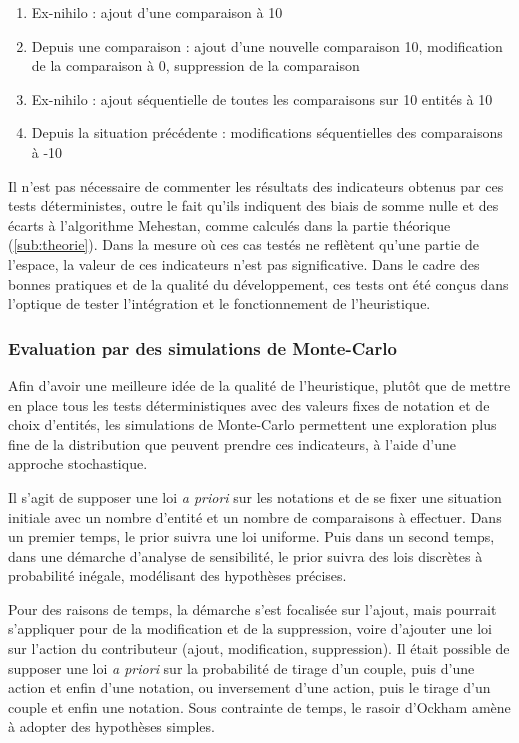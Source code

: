 \begin{enumerate}
    \item Ex-nihilo : ajout d'une comparaison à 10
    \item Depuis une comparaison : ajout d'une nouvelle comparaison 10, modification de la comparaison à 0, suppression de la comparaison
    \item Ex-nihilo : ajout séquentielle de toutes les comparaisons sur 10 entités à 10
    \item Depuis la situation précédente : modifications séquentielles des comparaisons à -10
\end{enumerate}

Il n'est pas nécessaire de commenter les résultats des indicateurs obtenus par ces tests déterministes, outre le fait qu'ils indiquent des biais de somme nulle et des écarts à l'algorithme Mehestan, comme calculés dans la partie théorique (\ref{sub:theorie}). Dans la mesure où ces cas testés ne reflètent qu'une partie de l'espace, la valeur de ces indicateurs n'est pas significative. Dans le cadre des bonnes pratiques et de la qualité du développement, ces tests ont été conçus dans l'optique de tester l'intégration et le fonctionnement de l'heuristique.


\subsubsection{Evaluation par des simulations de Monte-Carlo}

Afin d'avoir une meilleure idée de la qualité de l'heuristique, plutôt que de mettre en place tous les tests déterministiques avec des valeurs fixes de notation et de choix d'entités, les simulations de Monte-Carlo permettent une exploration plus fine de la distribution que peuvent prendre ces indicateurs, à l'aide d'une approche stochastique.

Il s'agit de supposer une loi \textit{a priori} sur les notations et de se fixer une situation initiale avec un nombre d'entité et un nombre de comparaisons à effectuer. Dans un premier temps, le prior suivra une loi uniforme. Puis dans un second temps, dans une démarche d'analyse de sensibilité, le prior suivra des lois discrètes à probabilité inégale, modélisant des hypothèses précises.

Pour des raisons de temps, la démarche s'est focalisée sur l'ajout, mais pourrait s'appliquer pour de la modification et de la suppression, voire d'ajouter une loi sur l'action du contributeur (ajout, modification, suppression). Il était possible de supposer une loi \textit{a priori} sur
la probabilité de tirage d'un couple, puis d'une action et enfin d'une notation, ou inversement d'une action, puis le tirage d'un couple et enfin une notation. Sous contrainte de temps, le rasoir d'Ockham amène à adopter des hypothèses simples.

